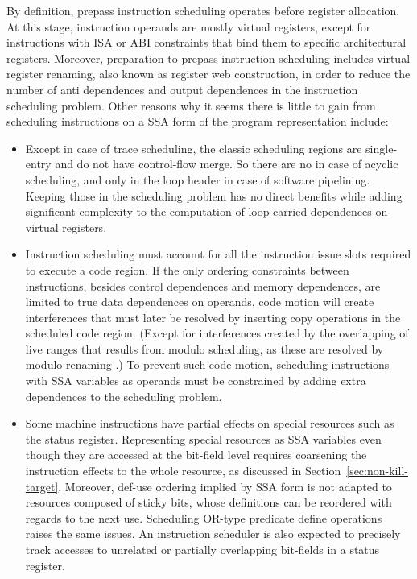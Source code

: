 By definition, prepass instruction scheduling operates before register
allocation. At this stage, instruction operands are mostly virtual registers,
except for instructions with ISA or ABI constraints that bind them to specific
architectural registers. Moreover, preparation to prepass instruction
scheduling includes virtual register renaming, also known as register web
construction, in order to reduce the number of anti dependences and output
dependences in the instruction scheduling problem. Other reasons why it seems
there is little to gain from scheduling instructions on a SSA form of the program
representation include: \begin{itemize}

\item Except in case of trace scheduling,
the classic scheduling regions are single-entry and do not
have control-flow merge. So there are no \phifuns in case of acyclic
scheduling, and only \phifuns in the loop header in case of software
pipelining. Keeping those \phifuns in the scheduling problem has no direct
benefits while adding significant complexity to the computation of loop-carried
dependences on virtual registers.

\item Instruction scheduling must account for all the instruction issue slots
required to execute a code region. If the only ordering constraints between
instructions, besides control dependences and memory dependences, are limited to
true data dependences on operands, code motion will create interferences that
must later be resolved by inserting copy operations in the scheduled code
region. (Except for interferences created by the overlapping of live ranges
that results from modulo scheduling, as these are resolved by modulo renaming
\cite{Lam:1988:PLDI}.) To prevent such code motion, scheduling instructions with
SSA variables as operands must be constrained by adding extra dependences to the
scheduling problem.

\item Some machine instructions have partial effects on special resources such
as the status register. Representing special resources as SSA variables even
though they are accessed at the bit-field level requires coarsening the
instruction effects to the whole resource, as discussed in
Section~\ref{sec:non-kill-target}. Moreover, def-use ordering implied by SSA
form is not adapted
to resources composed of sticky bits, whose definitions can be reordered with
regards to the next use. Scheduling OR-type predicate
define operations~\cite{Schlansker:1999:PLDI} raises the same issues. An
instruction scheduler is also expected to precisely track accesses to unrelated
or partially overlapping bit-fields in a status register.


\end{itemize}
